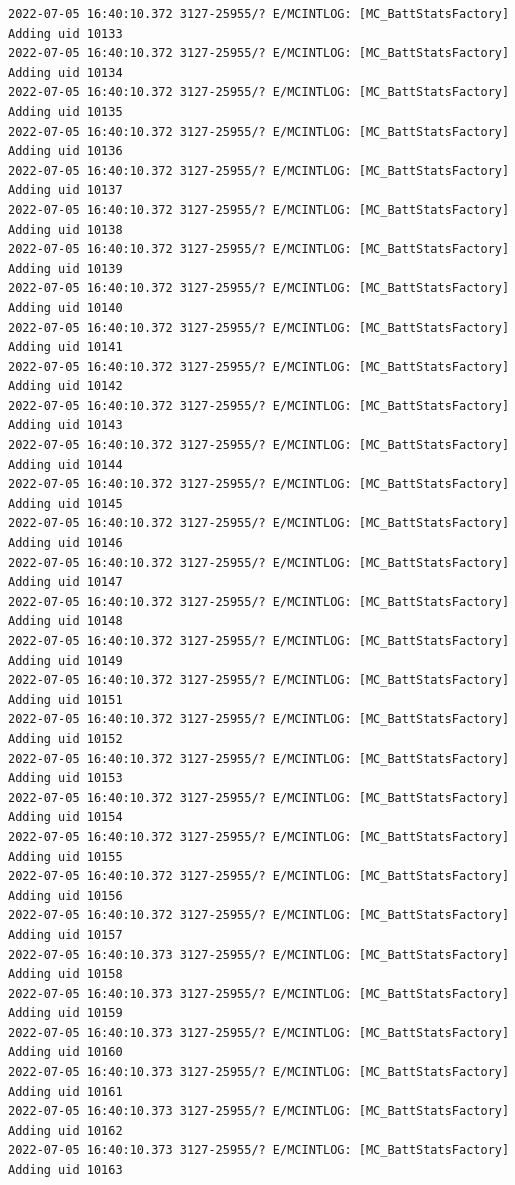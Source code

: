 \documentclass[a4paper,12pt]{book}
\begin{document}
\begin{lstlisting}
2022-07-05 16:40:10.372 3127-25955/? E/MCINTLOG: [MC_BattStatsFactory] Adding uid 10133
2022-07-05 16:40:10.372 3127-25955/? E/MCINTLOG: [MC_BattStatsFactory] Adding uid 10134
2022-07-05 16:40:10.372 3127-25955/? E/MCINTLOG: [MC_BattStatsFactory] Adding uid 10135
2022-07-05 16:40:10.372 3127-25955/? E/MCINTLOG: [MC_BattStatsFactory] Adding uid 10136
2022-07-05 16:40:10.372 3127-25955/? E/MCINTLOG: [MC_BattStatsFactory] Adding uid 10137
2022-07-05 16:40:10.372 3127-25955/? E/MCINTLOG: [MC_BattStatsFactory] Adding uid 10138
2022-07-05 16:40:10.372 3127-25955/? E/MCINTLOG: [MC_BattStatsFactory] Adding uid 10139
2022-07-05 16:40:10.372 3127-25955/? E/MCINTLOG: [MC_BattStatsFactory] Adding uid 10140
2022-07-05 16:40:10.372 3127-25955/? E/MCINTLOG: [MC_BattStatsFactory] Adding uid 10141
2022-07-05 16:40:10.372 3127-25955/? E/MCINTLOG: [MC_BattStatsFactory] Adding uid 10142
2022-07-05 16:40:10.372 3127-25955/? E/MCINTLOG: [MC_BattStatsFactory] Adding uid 10143
2022-07-05 16:40:10.372 3127-25955/? E/MCINTLOG: [MC_BattStatsFactory] Adding uid 10144
2022-07-05 16:40:10.372 3127-25955/? E/MCINTLOG: [MC_BattStatsFactory] Adding uid 10145
2022-07-05 16:40:10.372 3127-25955/? E/MCINTLOG: [MC_BattStatsFactory] Adding uid 10146
2022-07-05 16:40:10.372 3127-25955/? E/MCINTLOG: [MC_BattStatsFactory] Adding uid 10147
2022-07-05 16:40:10.372 3127-25955/? E/MCINTLOG: [MC_BattStatsFactory] Adding uid 10148
2022-07-05 16:40:10.372 3127-25955/? E/MCINTLOG: [MC_BattStatsFactory] Adding uid 10149
2022-07-05 16:40:10.372 3127-25955/? E/MCINTLOG: [MC_BattStatsFactory] Adding uid 10151
2022-07-05 16:40:10.372 3127-25955/? E/MCINTLOG: [MC_BattStatsFactory] Adding uid 10152
2022-07-05 16:40:10.372 3127-25955/? E/MCINTLOG: [MC_BattStatsFactory] Adding uid 10153
2022-07-05 16:40:10.372 3127-25955/? E/MCINTLOG: [MC_BattStatsFactory] Adding uid 10154
2022-07-05 16:40:10.372 3127-25955/? E/MCINTLOG: [MC_BattStatsFactory] Adding uid 10155
2022-07-05 16:40:10.372 3127-25955/? E/MCINTLOG: [MC_BattStatsFactory] Adding uid 10156
2022-07-05 16:40:10.372 3127-25955/? E/MCINTLOG: [MC_BattStatsFactory] Adding uid 10157
2022-07-05 16:40:10.373 3127-25955/? E/MCINTLOG: [MC_BattStatsFactory] Adding uid 10158
2022-07-05 16:40:10.373 3127-25955/? E/MCINTLOG: [MC_BattStatsFactory] Adding uid 10159
2022-07-05 16:40:10.373 3127-25955/? E/MCINTLOG: [MC_BattStatsFactory] Adding uid 10160
2022-07-05 16:40:10.373 3127-25955/? E/MCINTLOG: [MC_BattStatsFactory] Adding uid 10161
2022-07-05 16:40:10.373 3127-25955/? E/MCINTLOG: [MC_BattStatsFactory] Adding uid 10162
2022-07-05 16:40:10.373 3127-25955/? E/MCINTLOG: [MC_BattStatsFactory] Adding uid 10163

\end{lstlisting}
\end{document}
